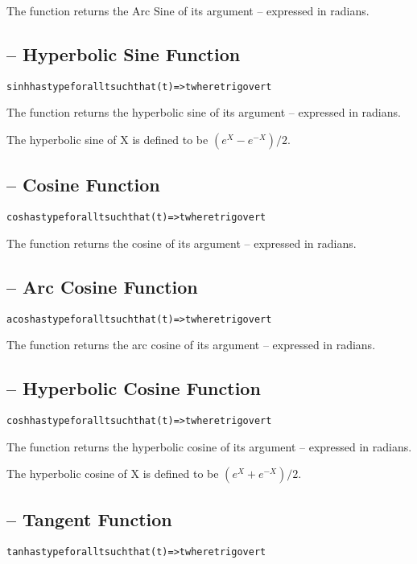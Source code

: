 The  function returns the Arc Sine of its argument -- expressed in radians.

\subsection{ -- Hyperbolic Sine Function}
\begin{alltt}
sinh has type for all t such that (t)=>t where trig over t
\end{alltt}

The  function returns the hyperbolic sine of its argument -- expressed in radians.

The hyperbolic sine of X is defined to be $(e^X - e^{-X})/2$.

\subsection{ -- Cosine Function}
\begin{alltt}
cos has type for all t such that (t)=>t where trig over t
\end{alltt}

The  function returns the cosine of its argument -- expressed in radians.

\subsection{ -- Arc Cosine Function}
\begin{alltt}
acos has type for all t such that (t)=>t where trig over t
\end{alltt}

The  function returns the arc cosine of its argument -- expressed in radians.

\subsection{ -- Hyperbolic Cosine Function}
\begin{alltt}
cosh has type for all t such that (t)=>t where trig over t
\end{alltt}

The  function returns the hyperbolic cosine of its argument -- expressed in radians.

The hyperbolic cosine of X is defined to be $(e^X + e^{-X})/2$.

\subsection{ -- Tangent Function}
\begin{alltt}
tan has type for all t such that (t)=>t where trig over t
\end{alltt}

